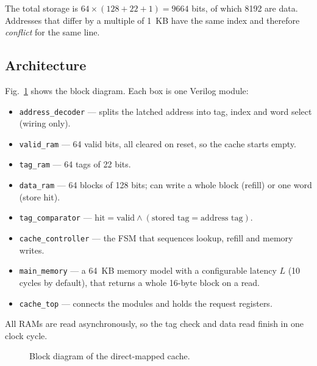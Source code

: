 \documentclass[conference]{IEEEtran}
\begin{document}
The total storage is $64 \times (128 + 22 + 1) = 9664$ bits, of which 8192 are data. Addresses that differ by a
multiple of 1~KB have the same index and therefore \emph{conflict} for the same line.

\subsection{Architecture}
Fig.~\ref{fig:block} shows the block diagram. Each box is one Verilog module:
\begin{itemize}
\item \texttt{address\_decoder} --- splits the latched address into tag, index and word select (wiring only).
\item \texttt{valid\_ram} --- 64 valid bits, all cleared on reset, so the cache starts empty.
\item \texttt{tag\_ram} --- 64 tags of 22 bits.
\item \texttt{data\_ram} --- 64 blocks of 128 bits; can write a whole block (refill) or one word (store hit).
\item \texttt{tag\_comparator} --- $\text{hit} = \text{valid} \wedge (\text{stored tag} = \text{address tag})$.
\item \texttt{cache\_controller} --- the FSM that sequences lookup, refill and memory writes.
\item \texttt{main\_memory} --- a 64~KB memory model with a configurable latency $L$ (10 cycles by default),
      that returns a whole 16-byte block on a read.
\item \texttt{cache\_top} --- connects the modules and holds the request registers.
\end{itemize}
All RAMs are read asynchronously, so the tag check and data read finish in one clock cycle.

\begin{figure}[t]
\centering
\resizebox{\columnwidth}{!}{}
\caption{Block diagram of the direct-mapped cache.}
\label{fig:block}
\end{figure}
\end{document}

